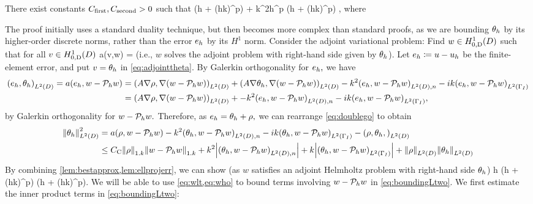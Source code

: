 \label{lem:ltthetahbound}
There exist constants $C_{\mathrm{first}}, C_{\mathrm{second}} > 0$ such that
\beq\label{eq:ltthetahbound}
\NLtD{\thetah} \leq \Cfirst \mleft(\CFEMotilde h + \CFEMttilde \CAnk (hk)^p\mright) \NW{\rho} + \Csecond k^2h^p \mleft(\CFEMotilde h + \CFEMttilde \CAnk (hk)^p\mright) ,
\eeq
where
\ele

The proof initially uses a standard duality technique, but then becomes more complex than standard proofs, as we are bounding $\theta_{h}$ by its higher-order discrete norms, rather than the error $e_{h}$ by its $H^1$ norm.
Consider the adjoint variational problem: Find $w \in \HozDD$ such that for all $v \in \HozDD$
\beq\label{eq:adjointtheta}
a(v,w) = 
\eeq
(i.e., $w$ solves the adjoint problem with right-hand side given by $\theta_{h}$). Let $e_{h} \coloneqq u -u_{h}$ be the finite-element error, and put $v = \theta_{h}$ in \cref{eq:adjointtheta}. By Galerkin orthogonality for $e_{h},$ we have
\begin{align}
\IPLtD{\eh}{\thetah} = a(\eh,w-\Ph w) &= \IPLtD{A \grad \rho}{\grad(w-\Ph w)} + \IPLtD{A \grad \thetah}{\grad(w-\Ph w)} -k^2 \IPLtDn{\eh}{w-\Ph w} -ik \IPLtGI{\eh}{w-\Ph w}\nonumber\\
&= \IPLtD{A \grad \rho}{\grad(w-\Ph w)} + -k^2 \IPLtDn{\eh}{w-\Ph w} -ik \IPLtGI{\eh}{w-\Ph w},\label{eq:doublego}
\end{align}
by Galerkin orthogonality for $w - \mathcal P_{h} w.$ Therefore, as $e_{h} = \theta_{h} + \rho,$ we can rearrange \cref{eq:doublego} to obtain
\begin{align}
\NLtD{\thetah}^2 &= a(\rho,w - \Ph w) -k^2 \IPLtDn{\thetah}{w-\Ph w} -ik \IPLtGI{\thetah}{w - \Ph w} - \IPLtD{\rho,\thetah}\nonumber\\
&\leq \Cc \NW{\rho} \NW{w- \Ph w} + k^2 \abs{\IPLtDn{\thetah}{w- \Ph w}} + k \abs{\IPLtGI{\thetah}{w-\Ph w}} + \NLtD{\rho}\NLtD{\thetah}\label{eq:boundingLtwo}
\end{align}
By combining \cref{lem:bestapprox,lem:ellprojerr}, we can show (as $w$ satisfies an adjoint Helmholtz problem with right-hand side $\theta_{h}$)
\beq\label{eq:wlt}
 \leq {} h \mleft(\CFEMotilde h + \CFEMttilde \CAnk (hk)^p\mright)\NLtD{\thetah} \tand
\eeq
\beq\label{eq:who}
 \leq {} \mleft(\CFEMotilde h + \CFEMttilde \CAnk (hk)^p\mright)\NLtD{\thetah}.
\eeq
We will be able to use \cref{eq:wlt,eq:who} to bound terms involving $w - \mathcal P_{h} w$ in \cref{eq:boundingLtwo}. We first estimate the inner product terms in \cref{eq:boundingLtwo}:
